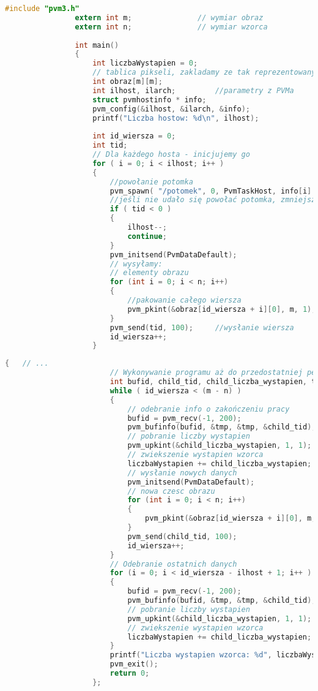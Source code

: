 				\begin{lstlisting}[language=C]
				#include "pvm3.h"
				extern int m;				// wymiar obraz
				extern int n;				// wymiar wzorca
				
				int main()
				{
					int liczbaWystapien = 0;
					// tablica pikseli, zakladamy ze tak reprezentowany jest obraz
					int obraz[m][m];		
					int ilhost, ilarch;			//parametry z PVMa
					struct pvmhostinfo * info;
					pvm_config(&ilhost, &ilarch, &info);
					printf("Liczba hostow: %d\n", ilhost);
					
					int id_wiersza = 0;
					int tid;
					// Dla każdego hosta - inicjujemy go
					for ( i = 0; i < ilhost; i++ )
					{
						//powołanie potomka
						pvm_spawn( "/potomek", 0, PvmTaskHost, info[i].hi_name, 1, &tid);
						//jeśli nie udało się powołać potomka, zmniejszamy liczbę hostów i kontynuujemy	
						if ( tid < 0 )
						{
							ilhost--;	
							continue;
						}
						pvm_initsend(PvmDataDefault);
						// wysyłamy:
						// elementy obrazu
						for (int i = 0; i < n; i++)
						{
							//pakowanie całego wiersza
							pvm_pkint(&obraz[id_wiersza + i][0], m, 1);
						}
						pvm_send(tid, 100);		//wysłanie wiersza
						id_wiersza++;
					}
				\end{lstlisting}
				\begin{lstlisting}[language=C]
					{ 	// ...
						// Wykonywanie programu aż do przedostatniej pętli
						int bufid, child_tid, child_liczba_wystapien, tmp;
						while ( id_wiersza < (m - n) )
						{
							// odebranie info o zakończeniu pracy
							bufid = pvm_recv(-1, 200);
							pvm_bufinfo(bufid, &tmp, &tmp, &child_tid);
							// pobranie liczby wystapien
							pvm_upkint(&child_liczba_wystapien, 1, 1);
							// zwiekszenie wystapien wzorca
							liczbaWystapien += child_liczba_wystapien;
							// wysłanie nowych danych
							pvm_initsend(PvmDataDefault);
							// nowa czesc obrazu
							for (int i = 0; i < n; i++)
							{
								pvm_pkint(&obraz[id_wiersza + i][0], m, 1);
							}
							pvm_send(child_tid, 100);
							id_wiersza++;
						}
						// Odebranie ostatnich danych
						for	(i = 0; i < id_wiersza - ilhost + 1; i++ )
						{
							bufid = pvm_recv(-1, 200);
							pvm_bufinfo(bufid, &tmp, &tmp, &child_tid);
							// pobranie liczby wystapien
							pvm_upkint(&child_liczba_wystapien, 1, 1);
							// zwiekszenie wystapien wzorca
							liczbaWystapien += child_liczba_wystapien;
						}
						printf("Liczba wystapien wzorca: %d", liczbaWystapien);
						pvm_exit();
						return 0;
					};
				\end{lstlisting}
